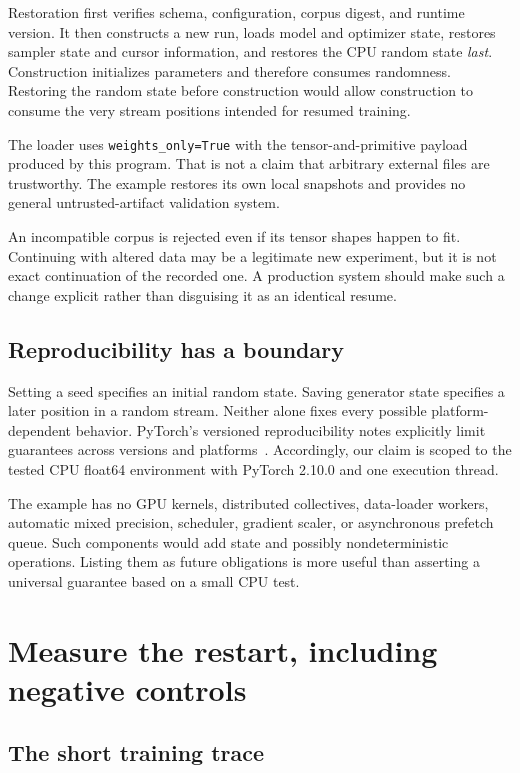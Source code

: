 Restoration first verifies schema, configuration, corpus digest, and runtime version. It then constructs a new run, loads model and optimizer state, restores sampler state and cursor information, and restores the CPU random state \emph{last}. Construction initializes parameters and therefore consumes randomness. Restoring the random state before construction would allow construction to consume the very stream positions intended for resumed training.

The loader uses \texttt{weights\_only=True} with the tensor-and-primitive payload produced by this program. That is not a claim that arbitrary external files are trustworthy. The example restores its own local snapshots and provides no general untrusted-artifact validation system.

An incompatible corpus is rejected even if its tensor shapes happen to fit. Continuing with altered data may be a legitimate new experiment, but it is not exact continuation of the recorded one. A production system should make such a change explicit rather than disguising it as an identical resume.

\subsection{Reproducibility has a boundary}

Setting a seed specifies an initial random state. Saving generator state specifies a later position in a random stream. Neither alone fixes every possible platform-dependent behavior. PyTorch's versioned reproducibility notes explicitly limit guarantees across versions and platforms~\cite{random}. Accordingly, our claim is scoped to the tested CPU float64 environment with PyTorch 2.10.0 and one execution thread.

The example has no GPU kernels, distributed collectives, data-loader workers, automatic mixed precision, scheduler, gradient scaler, or asynchronous prefetch queue. Such components would add state and possibly nondeterministic operations. Listing them as future obligations is more useful than asserting a universal guarantee based on a small CPU test.

\section{Measure the restart, including negative controls}

\subsection{The short training trace}

